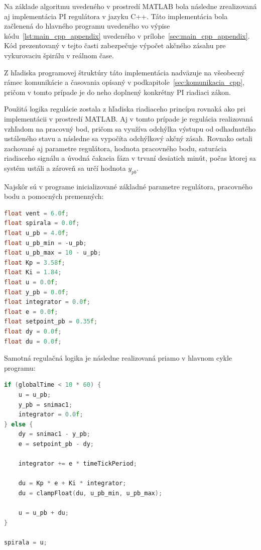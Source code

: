 Na základe algoritmu uvedeného v prostredí MATLAB bola následne zrealizovaná aj implementácia PI regulátora v jazyku C++.  
Táto implementácia bola začlenená do hlavného programu uvedeného vo výpise kódu~\ref{lst:main_cpp_appendix} uvedeného v prílohe~\ref{sec:main_cpp_appendix}. Kód prezentovaný v tejto časti zabezpečuje výpočet akčného zásahu pre vykurovaciu špirálu v reálnom čase.

Z hľadiska programovej štruktúry táto implementácia nadväzuje na všeobecný rámec
komunikácie a časovania opísaný v podkapitole~\ref{sec:komunikacia_cpp}, pričom
v tomto prípade je do neho doplnený konkrétny PI riadiaci zákon.

Použitá logika regulácie zostala z hľadiska riadiaceho princípu rovnaká ako pri implementácii v prostredí MATLAB.  
Aj v tomto prípade je regulácia realizovaná vzhľadom na pracovný bod, pričom sa využíva odchýlka výstupu od odhadnutého ustáleného stavu a následne sa vypočíta odchýlkový akčný zásah.  
Rovnako ostali zachované aj parametre regulátora, hodnota pracovného bodu, saturácia riadiaceho signálu a úvodná čakacia fáza v trvaní desiatich minút, počas ktorej sa systém ustáli a zároveň sa určí hodnota $y_{pb}$.

Najskôr sú v programe inicializované základné parametre regulátora, pracovného bodu a pomocných premenných:

\begin{lstlisting}[language=C++,
caption={Inicializácia parametrov PI regulátora v jazyku C++},
label={lst:pi_cpp_init}]
float vent = 6.0f;
float spirala = 0.0f;
float u_pb = 4.0f;
float u_pb_min = -u_pb;
float u_pb_max = 10 - u_pb;
float Kp = 3.58f;
float Ki = 1.84;
float u = 0.0f;
float y_pb = 0.0f;
float integrator = 0.0f;
float e = 0.0f;
float setpoint_pb = 0.35f;
float dy = 0.0f;
float du = 0.0f;
\end{lstlisting}

Samotná regulačná logika je následne realizovaná priamo v hlavnom cykle programu:

\begin{lstlisting}[language=C++,
caption={Hlavná regulačná logika PI regulátora v jazyku C++},
label={lst:pi_cpp_logic}]
if (globalTime < 10 * 60) {
    u = u_pb;
    y_pb = snimac1;
    integrator = 0.0f;
} else {
    dy = snimac1 - y_pb;
    e = setpoint_pb - dy;

    integrator += e * timeTickPeriod;

    du = Kp * e + Ki * integrator;
    du = clampFloat(du, u_pb_min, u_pb_max);

    u = u_pb + du;
}

spirala = u;
\end{lstlisting}

